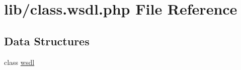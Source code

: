 \hypertarget{class_8wsdl_8php}{}\section{lib/class.wsdl.\+php File Reference}
\label{class_8wsdl_8php}
\subsection*{Data Structures}
\begin{DoxyCompactItemize}
\item 
class \hyperlink{classwsdl}{wsdl}
\end{DoxyCompactItemize}
